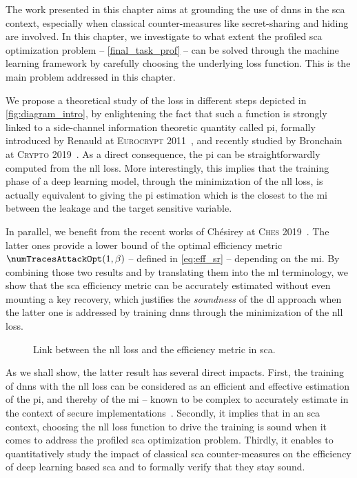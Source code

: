The work presented in this chapter aims at grounding the use of \glspl{dnn} in the \gls{sca} context, especially when classical counter-measures like secret-sharing and hiding are involved. 
In this chapter, we investigate to what extent the profiled \gls{sca} optimization problem -- \ie{} \autoref{final_task_prof} -- can be solved through the machine learning framework by carefully choosing the underlying loss function.
This is the main problem addressed in this chapter.

We propose a theoretical study of the  loss in different steps depicted in \autoref{fig:diagram_intro}, by enlightening the fact that such a function is strongly linked to a side-channel information theoretic quantity called \gls{pi}, formally introduced by Renauld \etal{} at \textsc{Eurocrypt} 2011~\cite{renauld_formal_2011}, and recently studied by Bronchain \etal{} at \textsc{Crypto} 2019~\cite{bronchain_leakage_2019}.
As a direct consequence, the \gls{pi} can be straightforwardly computed from the \gls{nll} loss.
More interestingly, this implies that the training phase of a deep learning model, through the minimization of the \gls{nll} loss, is actually equivalent to giving the \gls{pi} estimation which is the closest to the \gls{mi} between the leakage and the target sensitive variable.

In parallel, we benefit from the recent works of Chésirey \etal{} at \textsc{Ches} 2019~\cite{chesirey_best_2019}.
The latter ones provide a lower bound of the optimal efficiency metric \(\numTracesAttackOpt(1, \beta)\) -- defined in \autoref{eq:eff_sr} -- depending on the \gls{mi}.
By combining those two results and by translating them into the \gls{ml} terminology, we show that the \gls{sca} efficiency metric can be accurately estimated without even mounting a key recovery, which justifies the \emph{soundness} of the \gls{dl} approach when the latter one is addressed by training \glspl{dnn} through the minimization of the \gls{nll} loss.

\begin{figure}[h]
    \centering
    
    \caption{Link between the \gls{nll} loss and the efficiency metric in \gls{sca}.}
    \label{fig:diagram_intro}
\end{figure}

As we shall show, the latter result has several direct impacts.
First, the training of \glspl{dnn} with the \gls{nll} loss can be considered as an efficient and effective estimation of the \gls{pi}, and thereby of the \gls{mi} -- known to be complex to accurately estimate in the context of secure implementations~\cite{prouff_theoretical_2009,batina_mutual_2011}.
Secondly, it implies that in an \gls{sca} context, choosing the \gls{nll} loss function to drive the training is sound when it comes to address the profiled \gls{sca} optimization problem.
Thirdly, it enables to quantitatively study the impact of classical \gls{sca} counter-measures on the efficiency of deep learning based \gls{sca} and to formally verify that they stay sound.

